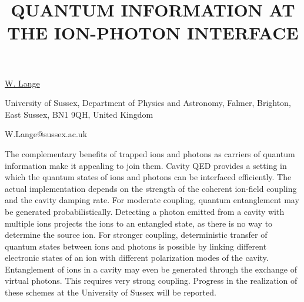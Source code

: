 \title{QUANTUM INFORMATION AT THE ION-PHOTON \mbox{INTERFACE}}

\underline{W. Lange} 

{\normalsize{\vspace{-4mm}
University of Sussex, Department of Physics and Astronomy, Falmer,
Brighton, East Sussex, BN1 9QH, United Kingdom

\email W.Lange@sussex.ac.uk}}

The complementary benefits of trapped ions and photons as carriers of
quantum information make it appealing to join them. Cavity QED provides
a setting in which the quantum states of ions and photons can be
interfaced efficiently. The actual implementation depends on the
strength of the coherent ion-field coupling and the cavity damping rate.
For moderate coupling, quantum entanglement may be generated
probabilistically. Detecting a photon emitted from a cavity with
multiple ions projects the ions to an entangled state, as there is no
way to determine the source ion. For stronger coupling, deterministic
transfer of quantum states between ions and photons is possible by
linking different electronic states of an ion with different
polarization modes of the cavity. Entanglement of ions in a cavity may
even be generated through the exchange of virtual photons. This requires
very strong coupling. Progress in the realization of these schemes at
the University of Sussex will be reported.

\vspace{\baselineskip}